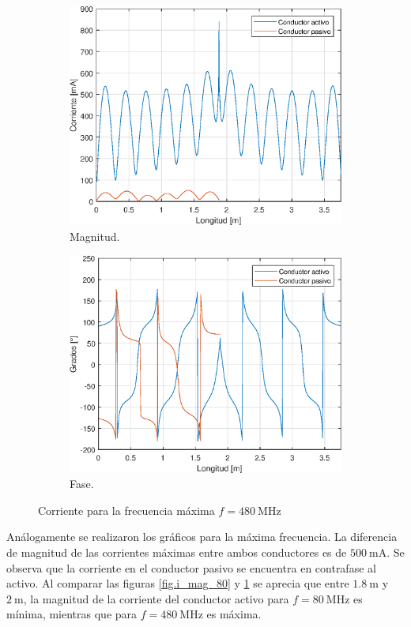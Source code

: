 \begin{figure}[H]
\begin{subfigure}{0.5\textwidth}
		\includegraphics[scale=0.6]{imagenes/i_mag_480.eps}
		\caption{Magnitud.}
		\label{fig.i_mag_480}
	\end{subfigure}
	\quad
	\begin{subfigure}{0.5\textwidth}
		\includegraphics[scale=0.6]{imagenes/i_fase_480.eps}
		\caption{Fase.}
		\label{fig.i_fase_480}
	\end{subfigure}
	\caption{Corriente para la frecuencia máxima $f = \SI{480}{\mega\hertz}$}
	\label{fig.i_480}
\end{figure}


Análogamente se realizaron los gráficos para la máxima frecuencia. La diferencia de magnitud de las corrientes máximas entre ambos conductores es de $\SI{500}{\milli\ampere}$. Se observa que la corriente en el conductor pasivo se encuentra en contrafase al activo. Al comparar las figuras \ref{fig.i_mag_80} y \ref{fig.i_mag_480} se aprecia que entre $\SI{1.8}{\meter}$ y $\SI{2}{\meter}$, la magnitud de la corriente del conductor activo para $f=\SI{80}{\mega\hertz}$ es mínima, mientras que para $f=\SI{480}{\mega\hertz}$ es máxima.